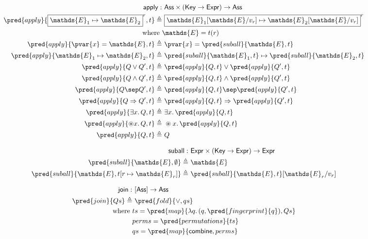 \begin{align*}
\mathsf{apply} :&\ \mathsf{Ass} \times (\mathsf{Key} \rightarrow \mathsf{Expr}) \rightarrow \mathsf{Ass} \\
\pred{apply}{\boxed{\mathds{E}_1 \mapsto \mathds{E}_2}^r, t} \triangleq&\ \boxed{\mathds{E}_1[\mathds{E}/v_r] \mapsto \mathds{E}_2[\mathds{E}/v_r]}^r \\
\text{where }& \mathds{E} = t(r) \\
\pred{apply}{\pvar{x} = \mathds{E}, t} \triangleq&\ \pvar{x} = \pred{suball}{\mathds{E}, t} \\
\pred{apply}{\mathds{E}_1 \mapsto \mathds{E}_2, t} \triangleq&\ \pred{suball}{\mathds{E}_1, t} \mapsto \pred{suball}{\mathds{E}_2, t} \\
\pred{apply}{Q \lor Q', t} \triangleq&\ \pred{apply}{Q, t} \lor \pred{apply}{Q', t} \\
\pred{apply}{Q \land Q', t} \triangleq&\ \pred{apply}{Q, t} \land \pred{apply}{Q', t} \\
\pred{apply}{Q \sep Q', t} \triangleq&\ \pred{apply}{Q, t} \sep \pred{apply}{Q', t} \\
\pred{apply}{Q \Rightarrow Q', t} \triangleq&\ \pred{apply}{Q, t} \Rightarrow \pred{apply}{Q', t} \\
\pred{apply}{\exists x \ldotp Q, t} \triangleq&\ \exists x \ldotp \pred{apply}{Q, t} \\
\pred{apply}{\circledast x \ldotp Q, t} \triangleq&\ \circledast x \ldotp \pred{apply}{Q, t} \\
\pred{apply}{Q, t} \triangleq&\ Q
\end{align*}

\begin{align*}
\mathsf{suball} :&\ \mathsf{Expr} \times (\mathsf{Key} \rightarrow \mathsf{Expr}) \rightarrow \mathsf{Expr} \\
\pred{suball}{\mathds{E}, \emptyset} \triangleq&\ \mathds{E} \\
\pred{suball}{\mathds{E}, t[r \mapsto \mathds{E}_r]} \triangleq&\ \pred{suball}{\mathds{E}, t}[\mathds{E}_r / v_r]
\end{align*}

\begin{align*}
\mathsf{join} :&\ [\mathsf{Ass}] \rightarrow \mathsf{Ass} \\
\pred{join}{Qs} \triangleq&\ \pred{fold}{\lor, qs} \\
	\text{where }& ts = \pred{map}{\lambda q \ldotp (q, \pred{fingerprint}{q}), Qs} \\
		& perms = \pred{permutations}{ts} \\
		& qs = \pred{map}{\mathsf{combine}, perms} \\
\end{align*}

